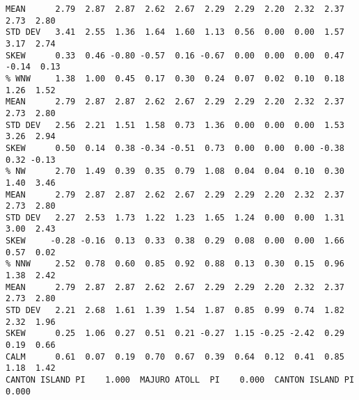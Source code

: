 \begin{verbatim}
MEAN      2.79  2.87  2.87  2.62  2.67  2.29  2.29  2.20  2.32  2.37  2.73  2.80
STD DEV   3.41  2.55  1.36  1.64  1.60  1.13  0.56  0.00  0.00  1.57  3.17  2.74
SKEW      0.33  0.46 -0.80 -0.57  0.16 -0.67  0.00  0.00  0.00  0.47 -0.14  0.13
% WNW     1.38  1.00  0.45  0.17  0.30  0.24  0.07  0.02  0.10  0.18  1.26  1.52
MEAN      2.79  2.87  2.87  2.62  2.67  2.29  2.29  2.20  2.32  2.37  2.73  2.80
STD DEV   2.56  2.21  1.51  1.58  0.73  1.36  0.00  0.00  0.00  1.53  3.26  2.94
SKEW      0.50  0.14  0.38 -0.34 -0.51  0.73  0.00  0.00  0.00 -0.38  0.32 -0.13
% NW      2.70  1.49  0.39  0.35  0.79  1.08  0.04  0.04  0.10  0.30  1.40  3.46
MEAN      2.79  2.87  2.87  2.62  2.67  2.29  2.29  2.20  2.32  2.37  2.73  2.80
STD DEV   2.27  2.53  1.73  1.22  1.23  1.65  1.24  0.00  0.00  1.31  3.00  2.43
SKEW     -0.28 -0.16  0.13  0.33  0.38  0.29  0.08  0.00  0.00  1.66  0.57  0.02
% NNW     2.52  0.78  0.60  0.85  0.92  0.88  0.13  0.30  0.15  0.96  1.38  2.42
MEAN      2.79  2.87  2.87  2.62  2.67  2.29  2.29  2.20  2.32  2.37  2.73  2.80
STD DEV   2.21  2.68  1.61  1.39  1.54  1.87  0.85  0.99  0.74  1.82  2.32  1.96
SKEW      0.25  1.06  0.27  0.51  0.21 -0.27  1.15 -0.25 -2.42  0.29  0.19  0.66
CALM      0.61  0.07  0.19  0.70  0.67  0.39  0.64  0.12  0.41  0.85  1.18  1.42
CANTON ISLAND PI    1.000  MAJURO ATOLL  PI    0.000  CANTON ISLAND PI    0.000
\end{verbatim}